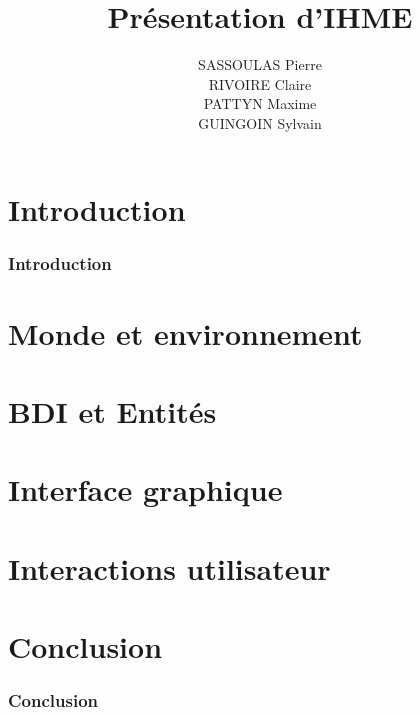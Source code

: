 \documentclass{beamer}
\title{Présentation d'IHME}
\author{SASSOULAS Pierre\\RIVOIRE Claire\\PATTYN Maxime\\GUINGOIN Sylvain}
\begin{document}
\frame{\titlepage}
\frame{\tableofcontents}

\section{Introduction}
\begin{frame}
  \frametitle{Introduction}
\end{frame}

\section{Monde et environnement}
\begin{frame}
  
\end{frame}

\section{BDI et Entités}
\begin{frame}
  
\end{frame}

\section{Interface graphique}
\begin{frame}
  
\end{frame}

\section{Interactions utilisateur}
\begin{frame}
  
\end{frame}

\section{Conclusion}
\begin{frame}
  \frametitle{Conclusion}
\end{frame}
\end{document}
